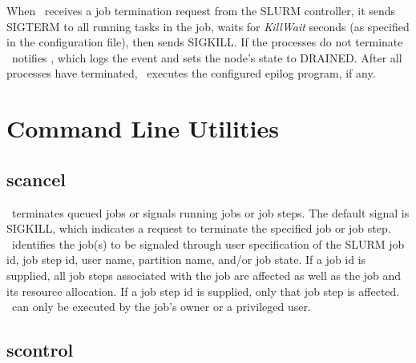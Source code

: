 \documentclass[10pt,onecolumn,times]{llncs}
\begin{document}
{When \slurmd\ receives a job termination request from the SLURM
controller, it sends SIGTERM to all running tasks in the job,
waits for {\em KillWait} seconds (as specified in the configuration
file), then sends SIGKILL. If the processes do not terminate \slurmd\
notifies \slurmctld , which logs the event and sets the node's state
to DRAINED. After all processes have terminated, \slurmd\ executes the
configured epilog program, if any.

\section{Command Line Utilities}

\subsection{scancel}

\scancel\ terminates queued jobs or signals running jobs or job steps.
The default signal is SIGKILL, which indicates a request to terminate
the specified job or job step.  \scancel\ identifies the job(s) to
be signaled through user specification of the SLURM job id, job step id,
user name, partition name, and/or job state.  If a job id is supplied,
all job steps associated with the job are affected as well as the job
and its resource allocation.  If a job step id is supplied, only that
job step is affected.  \scancel\ can only be executed by the job's owner
or a privileged user.

\subsection{scontrol}

}
\end{document}

